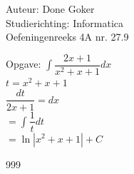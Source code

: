\documentclass[a4paper]{article}
\begin{document}
  
\noindent \large Auteur: Done Goker \\
\noindent \large Studierichting: Informatica\\
\noindent \large Oefeningenreeks 4A nr. 27.9\\

\medskip

\normalsize
Opgave:
$\displaystyle\int  \dfrac{2x+1} {x^2+x+1} dx$ \\

$ t = x^2+x+1$ \\

$\dfrac{dt}{2x+1} = dx$ \\


$= \displaystyle\int \dfrac{1}{t} dt $ \\

$= \ln|x^2+x+1| + C $ \\ 


\begin{thebibliography}{999}
\end{thebibliography}
\end{document}
